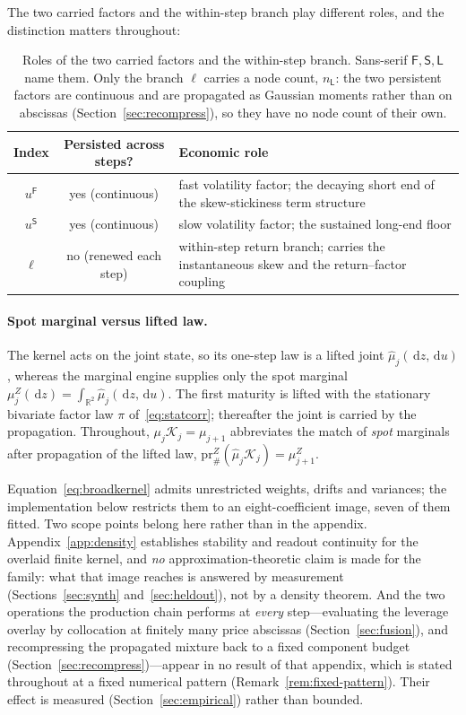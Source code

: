 \documentclass[11pt]{article}
\newcommand{\R}{\mathbb{R}}
\newcommand{\cK}{\mathcal{K}}
\providecommand{\pr}{\mathrm{pr}}
\providecommand{\1}{\mathbf 1}
\newcommand{\dd}{\,\mathrm{d}}
\begin{document}
The two carried factors and the within-step branch play different roles, and the distinction
matters throughout:

\begin{table}[htbp]
\centering\small
\begin{tabular}{c c p{}}
\toprule
Index & Persisted across steps? & Economic role \\
\midrule
$u^{\mathsf F}$ & yes (continuous) & fast volatility factor; the decaying short end of the
skew-stickiness term structure \\[2pt]
$u^{\mathsf S}$ & yes (continuous) & slow volatility factor; the sustained long-end floor \\[2pt]
$\ell$ & no (renewed each step) & within-step return branch; carries the instantaneous skew and
the return--factor coupling \\
\bottomrule
\end{tabular}
\caption{Roles of the two carried factors and the within-step branch. Sans-serif
$\mathsf F,\mathsf S,\mathsf L$ name them. Only the branch $\ell$ carries a node count,
$n_{\mathsf L}$: the two persistent factors are continuous and are propagated as Gaussian moments
rather than on abscissas (Section~\ref{sec:recompress}), so they have no node count of their own.}
\label{tab:indices}
\end{table}

\paragraph{Spot marginal versus lifted law.} The kernel acts on the joint state, so its one-step
law is a lifted joint $\widehat\mu_j(\dd z,\dd u)$, whereas the marginal engine supplies only the
spot marginal $\mu_j^Z(\dd z)=\int_{\R^2}\widehat\mu_j(\dd z,\dd u)$. The first maturity is lifted
with the stationary bivariate factor law $\pi$ of~\eqref{eq:statcorr}; thereafter the joint is
carried by the propagation. Throughout, $\mu_j\cK_j=\mu_{j+1}$ abbreviates the match of \emph{spot} marginals
after propagation of the lifted law, $\pr^Z_{\#}(\widehat\mu_j\cK_j)=\mu^Z_{j+1}$.

Equation~\eqref{eq:broadkernel} admits unrestricted weights, drifts and variances; the
implementation below restricts them to an eight-coefficient image, seven of them fitted. Two scope points belong here rather
than in the appendix. Appendix~\ref{app:density} establishes stability and readout continuity for
the overlaid finite kernel, and \emph{no} approximation-theoretic claim is made for the family: what
that image reaches is answered by measurement (Sections~\ref{sec:synth}
and~\ref{sec:heldout}), not by a density theorem. And the two operations the production chain
performs at \emph{every} step---evaluating the leverage overlay by collocation at finitely many
price abscissas (Section~\ref{sec:fusion}), and recompressing the propagated mixture back to a fixed
component budget (Section~\ref{sec:recompress})---appear in no result of that appendix, which is
stated throughout at a fixed numerical pattern (Remark~\ref{rem:fixed-pattern}). Their effect is
measured (Section~\ref{sec:empirical}) rather than bounded.
\end{document}
